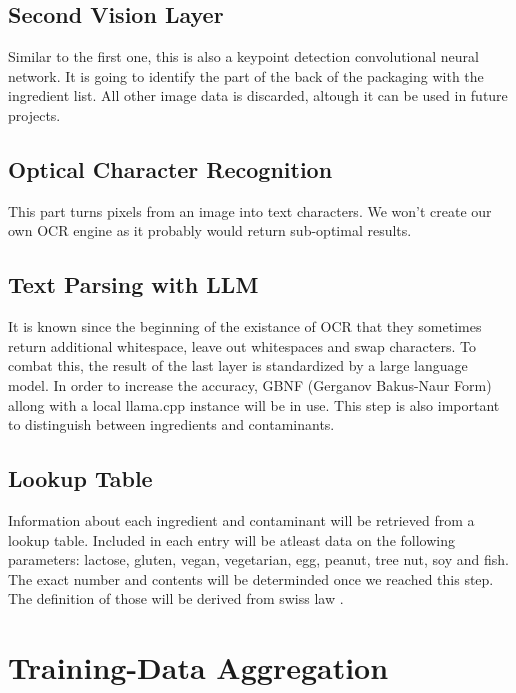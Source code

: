 \documentclass[a4paper,11pt]{report}
\begin{document}
            \subsection{Second Vision Layer}
                Similar to the first one, this is also a keypoint detection convolutional neural network.
                It is going to identify the part of the back of the packaging with the ingredient list. All other image data is discarded, altough it can be used in future projects.

            \subsection{Optical Character Recognition}
                This part turns pixels from an image into text characters. We won't create our own OCR engine as it probably would return sub-optimal results.

            \subsection{Text Parsing with LLM}
                It is known since the beginning of the existance of OCR that they sometimes return additional whitespace, leave out whitespaces and swap characters. To combat this, the result of the last layer is standardized by a large language model. In order to increase the accuracy, GBNF (Gerganov Bakus-Naur Form) \cite{gbnf} allong with a local llama.cpp \cite{llamacpp} instance will be in use. This step is also important to distinguish between ingredients and contaminants.

            \subsection{Lookup Table}
                \label{subsec:architecture:table}
                Information about each ingredient and contaminant will be retrieved from a lookup table. Included in each entry will be atleast data on the following parameters: lactose, gluten, vegan, vegetarian, egg, peanut, tree nut, soy and fish. The exact number and contents will be determinded once we reached this step. The definition of those will be derived from swiss law \cite{fedlex-ingredient}.

        \section{Training-Data Aggregation}
\end{document}
